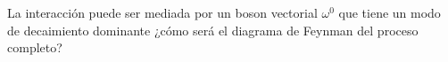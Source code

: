 \documentclass[./../main.tex]{subfiles}
\begin{document}
    \begin{exercise}
        La interacción  puede ser mediada por un boson vectorial \(\omega^{0}\) que tiene un modo de decaimiento dominante  ¿cómo será el diagrama de Feynman del proceso completo?
    \end{exercise}
\end{document}
